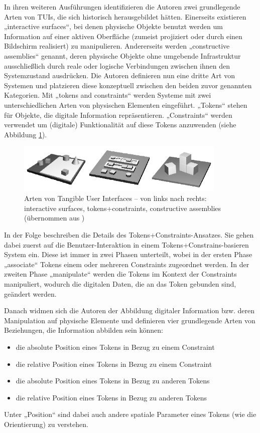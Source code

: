 In ihren weiteren Ausführungen identifizieren die Autoren zwei grundlegende Arten von \glspl{TUI}, die sich historisch herausgebildet hätten. Einerseits existieren „interactive surfaces“, bei denen physische Objekte benutzt werden um Information auf einer aktiven Oberfläche (zumeist projiziert oder durch einen Bildschirm realisiert) zu manipulieren. Andererseits werden „constructive assemblies“ genannt, deren physische Objekte ohne umgebende Infrastruktur ausschließlich durch reale oder logische Verbindungen zwischen ihnen den Systemzustand ausdrücken. Die Autoren definieren nun eine dritte Art von Systemen und platzieren diese konzeptuell zwischen den beiden zuvor genannten Kategorien. Mit „tokens and constraints“ werden Systeme mit zwei unterschiedlichen Arten von physischen Elementen eingeführt. „Tokens“ stehen für Objekte, die digitale Information repräsentieren. „Constraints“ werden verwendet um (digitale) Funktionalität auf diese Tokens anzuwenden (siehe Abbildung \ref{fig:img_ImplementierungUeberblick_is_tac_ca}).

\begin{figure}[htbp]
	\centering
		\includegraphics[width=10cm]{img/ImplementierungUeberblick/is_tac_ca.png}
	\caption[Arten von Tangible User Interfaces]{Arten von Tangible User Interfaces -- von links nach rechts: interactive surfaces, tokens+constraints, constructive assemblies (übernommen aus \citet{Ullmer05})}
	\label{fig:img_ImplementierungUeberblick_is_tac_ca}
\end{figure}

In der Folge beschreiben \citeauthor{Ullmer05} die Details des Tokens+Constraints-Ansatzes. Sie gehen dabei zuerst auf die Benutzer-Interaktion in einem Tokens+Constrains-basieren System ein. Diese ist immer in zwei Phasen unterteilt, wobei in der ersten Phase „associate“ Tokens einem oder mehreren Constraints zugeordnet werden. In der zweiten Phase „manipulate“ werden die Tokens im Kontext der Constraints manipuliert, wodurch die digitalen Daten, die an das Token gebunden sind, geändert werden.

Danach widmen sich die Autoren der Abbildung digitaler Information bzw. deren Manipulation auf physische Elemente und definieren vier grundlegende Arten von Beziehungen, die Information abbilden sein können:
\begin{itemize}
	\item die absolute Position eines Tokens in Bezug zu einem Constraint
	\item die relative Position eines Tokens in Bezug zu einem Constraint
	\item die absolute Position eines Tokens in Bezug zu anderen Tokens
	\item die relative Position eines Tokens in Bezug zu anderen Tokens
\end{itemize}
Unter „Position“ sind dabei auch andere spatiale Parameter eines Tokens (wie die Orientierung) zu verstehen.

